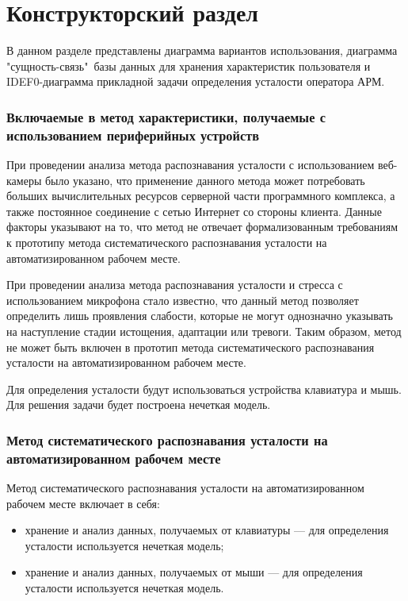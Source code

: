 \section{Конструкторский раздел}
В данном разделе представлены диаграмма вариантов использования, диаграмма "сущность-связь"\ базы данных для хранения характеристик пользователя и IDEF0-диаграмма прикладной задачи определения усталости оператора АРМ.

\subsubsection{Включаемые в метод характеристики, получаемые с использованием периферийных устройств}

При проведении анализа метода распознавания усталости с использованием веб-камеры было указано, что применение данного метода может потребовать больших вычислительных ресурсов серверной части программного комплекса, а также постоянное соединение с сетью Интернет со стороны клиента. Данные факторы указывают на то, что метод не отвечает формализованным требованиям к прототипу метода систематического распознавания усталости на автоматизированном рабочем месте.

При проведении анализа метода распознавания усталости и стресса с использованием микрофона стало известно, что данный метод позволяет определить лишь проявления слабости, которые не могут однозначно указывать на наступление стадии истощения, адаптации или тревоги. Таким образом, метод не может быть включен в прототип метода систематического распознавания усталости на автоматизированном рабочем месте.

Для определения усталости будут использоваться устройства клавиатура и мышь. Для решения задачи будет построена нечеткая модель.

\subsubsection{Метод систематического распознавания усталости на автоматизированном рабочем месте}
Метод систематического распознавания усталости на автоматизированном рабочем месте включает в себя:
\begin{itemize}[leftmargin=1.6\parindent]
\item хранение и анализ данных, получаемых от клавиатуры --- для определения усталости используется нечеткая модель;
\item хранение и анализ данных, получаемых от мыши --- для определения усталости используется нечеткая модель.
\end{itemize}

